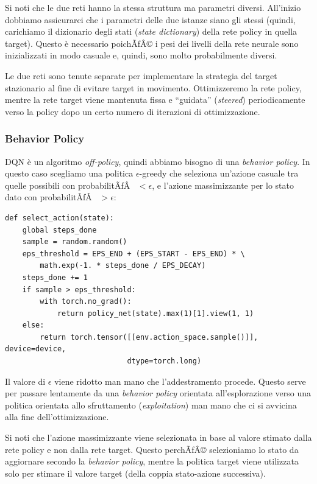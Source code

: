 ﻿\documentclass[11pt, a4paper]{report}
\begin{document}
Si noti che le due reti hanno la stessa struttura ma parametri diversi. All'inizio dobbiamo assicurarci che i parametri delle due istanze siano gli stessi (quindi, carichiamo il dizionario degli stati (\emph{state dictionary}) della rete policy in quella target). Questo è necessario poichÃƒÂ© i pesi dei livelli della rete neurale sono inizializzati in modo casuale e, quindi, sono molto probabilmente diversi.

Le due reti sono tenute separate per implementare la strategia del target stazionario al fine di evitare target in movimento. Ottimizzeremo la rete policy, mentre la rete target viene mantenuta fissa e ``guidata'' (\emph{steered}) periodicamente verso la policy dopo un certo numero di iterazioni di ottimizzazione.

\subsubsection{Behavior Policy}
DQN è un algoritmo \emph{off-policy}, quindi abbiamo bisogno di una \emph{behavior policy}. In questo caso scegliamo una politica $\epsilon$-greedy che seleziona un'azione casuale tra quelle possibili con probabilitÃƒÂ  $< \epsilon$, e l'azione massimizzante per lo stato dato con probabilitÃƒÂ  $> \epsilon$:

\begin{verbatim}
def select_action(state):
    global steps_done
    sample = random.random()
    eps_threshold = EPS_END + (EPS_START - EPS_END) * \
        math.exp(-1. * steps_done / EPS_DECAY)
    steps_done += 1
    if sample > eps_threshold:
        with torch.no_grad():
            return policy_net(state).max(1)[1].view(1, 1)
    else:
        return torch.tensor([[env.action_space.sample()]], device=device,
                            dtype=torch.long)
\end{verbatim}

Il valore di $\epsilon$ viene ridotto man mano che l'addestramento procede. Questo serve per passare lentamente da una \emph{behavior policy} orientata all'esplorazione verso una politica orientata allo sfruttamento (\emph{exploitation}) man mano che ci si avvicina alla fine dell'ottimizzazione.

Si noti che l'azione massimizzante viene selezionata in base al valore stimato dalla rete policy e non dalla rete target. Questo perchÃƒÂ© selezioniamo lo stato da aggiornare secondo la \emph{behavior policy}, mentre la politica target viene utilizzata solo per stimare il valore target (della coppia stato-azione successiva).
\end{document}
